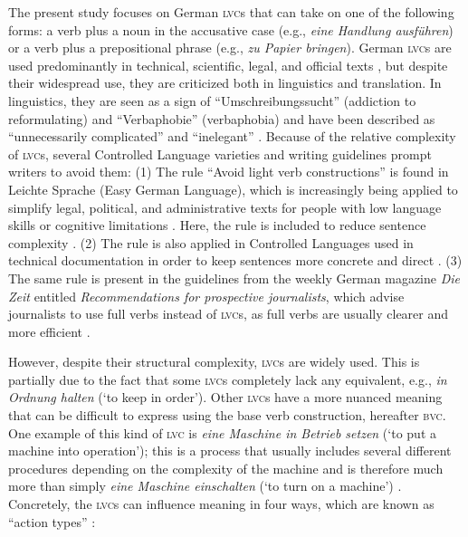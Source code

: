 \documentclass[output=paper]{langsci/langscibook}
\begin{document}
The present study focuses on German \textsc{lvc}s that can take on one of the following forms: a verb plus a noun in the accusative case (e.g., \textit{eine Handlung ausführen}) or a verb plus a prepositional phrase (e.g., \textit{zu Papier bringen}). German \textsc{lvc}s are used predominantly in technical, scientific, legal, and official texts \citep[38f.]{Bruker2013}, but despite their widespread use, they are criticized both in linguistics and translation. In linguistics, they are seen as a sign of “Umschreibungssucht” (addiction to reformulating) and “Verbaphobie” (verbaphobia) \citep[9f.]{Daniels1963} and have been described as “unnecessarily complicated” and “inelegant” \citep{Storrer2006a}. Because of the relative complexity of \textsc{lvc}s, several Controlled Language varieties and writing guidelines prompt writers to avoid them: (1) The rule “Avoid light verb constructions” is found in Leichte Sprache (Easy German Language), which is increasingly being applied to simplify legal, political, and administrative texts for people with low language skills or cognitive limitations \citep{Hansen-Schirra2018}. Here, the rule is included to reduce sentence complexity \citep{ubhd-67957969}. (2) The rule is also applied in Controlled Languages used in technical documentation in order to keep sentences more concrete and direct \citep[107]{GesellschaftfurTechnischeKommunikation2013}. (3) The same rule is present in the guidelines from the weekly German magazine \textit{Die Zeit} entitled \textit{Recommendations for prospective journalists}, which advise journalists to use full verbs instead of \textsc{lvc}s, as full verbs are usually clearer and more efficient \citep{Zeit2007}.

However, despite their structural complexity, \textsc{lvc}s are widely used. This is partially due to the fact that some \textsc{lvc}s completely lack any equivalent, e.g., \textit{in Ordnung halten} (`to keep in order'). Other \textsc{lvc}s have a more nuanced meaning that can be difficult to express using the base verb construction, hereafter \textsc{bvc}. One example of this kind of \textsc{lvc} is \textit{eine Maschine in Betrieb setzen} (`to put a machine into operation'); this is a process that usually includes several different procedures depending on the complexity of the machine and is therefore much more than simply \textit{eine Maschine einschalten} (`to turn on a machine') \citep{ubhd-67954849}. Concretely, the \textsc{lvc}s can influence meaning in four ways, which are known as “action types” \citep*[704]{Zifonun1997}:
\end{document}
